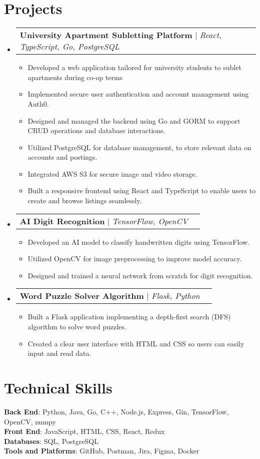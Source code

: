 \documentclass[letterpaper,11pt]{article}
\makeatletter
\newcommand{\resumeItem}[1]{
  \item\small{
    {#1 \vspace{-2pt}}
  }
}
\newcommand{\resumeProjectHeading}[2]{
    \item
    \begin{tabular*}{0.97\textwidth}{l@{\extracolsep{\fill}}r}
      \small#1 & #2 \\
    \end{tabular*}\vspace{-7pt}
}
\newcommand{\resumeSubHeadingListStart}{\begin{itemize}[leftmargin=0.15in, label={}]}
\newcommand{\resumeSubHeadingListEnd}{\end{itemize}}
\newcommand{\resumeItemListStart}{\begin{itemize}}
\newcommand{\resumeItemListEnd}{\end{itemize}\vspace{-5pt}}
\makeatother
\begin{document}
\section{Projects}
    \resumeSubHeadingListStart
      \resumeProjectHeading
          {\textbf{University Apartment Subletting Platform} $|$ \emph{React, TypeScript, Go, PostgreSQL}}{}
          \resumeItemListStart
            \resumeItem{Developed a web application tailored for university students to sublet apartments during co-op terms}
            \resumeItem{Implemented secure user authentication and account management using Auth0.}
            \resumeItem{Designed and managed the backend using Go and GORM to support CRUD operations and database interactions.}
            \resumeItem{Utilized PostgreSQL for database management, to store relevant data on accounts and postings.}
            \resumeItem{Integrated AWS S3 for secure image and video storage.}
            \resumeItem{Built a responsive frontend using React and TypeScript to enable users to create and browse listings seamlessly.}
          \resumeItemListEnd
      \resumeProjectHeading
          {\textbf{AI Digit Recognition} $|$ \emph{TensorFlow, OpenCV}}{}
          \resumeItemListStart
            \resumeItem{Developed an AI model to classify handwritten digits using TensorFlow.}
            \resumeItem{Utilized OpenCV for image preprocessing to improve model accuracy.}
            \resumeItem{Designed and trained a neural network from scratch for digit recognition.}
          \resumeItemListEnd
      \resumeProjectHeading
          {\textbf{Word Puzzle Solver Algorithm} $|$ \emph{Flask, Python}}{}
          \resumeItemListStart
            \resumeItem{Built a Flask application implementing a depth-first search (DFS) algorithm to solve word puzzles.}
            \resumeItem{Created a clear user interface with HTML and CSS so users can easily input and read data.}
          \resumeItemListEnd
    \resumeSubHeadingListEnd

\section{Technical Skills}
 \begin{itemize}[leftmargin=0.15in, label={}]
    \small{\item{
     \textbf{Back End}{: Python, Java, Go, C++, Node.js, Express, Gin, TensorFlow, OpenCV, numpy} \\
     \textbf{Front End}{: JavaScript, HTML, CSS, React, Redux} \\
     \textbf{Databases}{: SQL, PostgreSQL} \\
     \textbf{Tools and Platforms}{: GitHub, Postman, Jira, Figma, Docker}
    }}
 \end{itemize}

\end{document}
